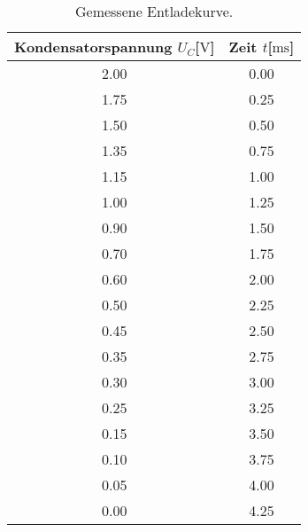     \begin{table}
        \centering
        \caption{Gemessene Entladekurve.}
        \label{tab:entladen}
        \begin{tabular}{c c}
            \toprule
            Kondensatorspannung $U_{C}$[$\si{\volt}$] & Zeit $t$[$\si{\milli\second}$] \\
            \midrule
            2.00    &   0.00\\   
            1.75    &   0.25\\  
            1.50    &   0.50\\
            1.35    &   0.75\\  
            1.15    &   1.00\\
            1.00    &   1.25\\
            0.90    &   1.50\\
            0.70    &   1.75\\
            0.60    &   2.00\\
            0.50    &   2.25\\
            0.45    &   2.50\\
            0.35    &   2.75\\
            0.30    &   3.00\\
            0.25    &   3.25\\  
            0.15    &   3.50\\
            0.10    &   3.75\\
            0.05    &   4.00\\
            0.00    &   4.25\\
            \bottomrule
        \end{tabular}
        \end{table}
